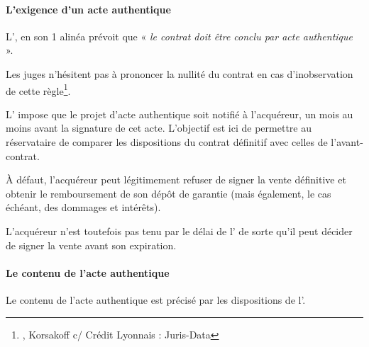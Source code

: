 			\paragraph{L'exigence d'un acte authentique}

				L', en son 1\ier{} alinéa prévoit que « {\itshape le contrat doit être conclu par acte authentique} ».

				Les juges n’hésitent pas à prononcer la nullité du contrat en cas d'inobservation de cette règle\footnote{, Korsakoff c/ Crédit Lyonnais : Juris-Data }.

				L' impose que le projet d’acte authentique soit notifié à l'acquéreur, un mois au moins avant la signature de cet acte.
				L’objectif est ici de permettre au réservataire de comparer les dispositions du contrat définitif avec celles de l’avant-contrat.

				À défaut, l'acquéreur peut légitimement refuser de signer la vente définitive et obtenir le remboursement de son dépôt de garantie (mais également, le cas échéant, des dommages et intérêts).

				L'acquéreur n'est toutefois pas tenu par le délai de l' {\cch} de sorte qu’il peut décider de signer la vente avant son expiration.

			\paragraph{Le contenu de l'acte authentique}

				Le contenu de l'acte authentique est précisé par les dispositions de l’.

